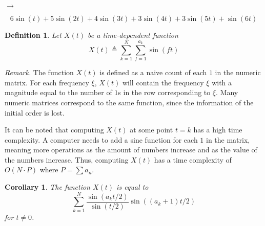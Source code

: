 \documentclass{article}
\newtheorem{definition}{Definition}[section]
\newtheorem{corollary}{Corollary}[section]
\begin{document}
\begin{minipage}{0.3\textwidth}
    \begin{flushright}        
    \end{flushright}
\end{minipage}
\hspace{0.5cm}\(\longrightarrow\)\hspace{0.5cm}
\begin{minipage}{0.5\textwidth}
    \[
        6\sin(t) + 5\sin(2t) + 4\sin(3t) + 3\sin(4t)+3\sin(5t)+\sin(6t)
    \]
\end{minipage}

\begin{definition}
    Let \(X(t)\) be a time-dependent function
    \[
        X(t) \triangleq
        \sum_{k=1}^{N}
        \sum_{f=1}^{a_k}
        \sin(ft)
    \]
\end{definition}

\textit{Remark.} The function \(X(t)\) is defined as a naive count of each \(1\) in the numeric matrix.
For each frequency \(\xi\), \(X(t)\) will contain the frequency \(\xi\) with a magnitude equal to
the number of \(1\)s in the row corresponding to \(\xi\).
Many numeric matrices correspond to the same function, since the information of the initial order is lost.

It can be noted that computing \(X(t)\) at some point \(t=k\) has a high time complexity.
A computer needs to add a sine function for each \(1\) in the matrix, meaning
more operations as the amount of numbers increase and as the value of the numbers increase.
Thus, computing \(X(t)\) has a time complexity of \(O(N \cdot P)\) where
\(P=\sum a_n\).

\begin{corollary}
    The function \(X(t)\) is equal to
    \[
        \sum_{k=1}^{N} \frac{\sin(a_k t/2)}{\sin(t/2)} \sin((a_k+1)t/2)
    \]
    for \(t \neq 0\).
\end{corollary}
\end{document}
